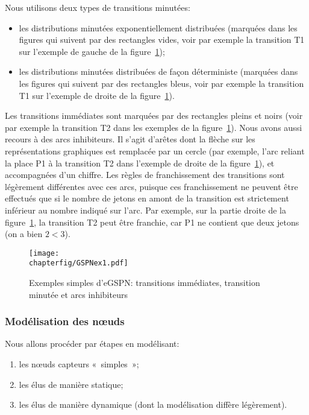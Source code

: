 Nous utilisons deux types de transitions minutées:
\begin{itemize}
    \item les distributions minutées exponentiellement distribuées (marquées dans les figures qui suivent par des rectangles vides, voir par exemple la transition \textsf{T1} sur l'exemple de gauche de la figure~\ref{sa:fig:gspnex1});
    \item les distributions minutées distribuées de façon déterministe (marquées dans les figures qui suivent par des rectangles bleus, voir par exemple la transition \textsf{T1} sur l'exemple de droite de la figure~\ref{sa:fig:gspnex1}).
\end{itemize}
Les transitions immédiates sont marquées par des rectangles pleins et noirs (voir par exemple la transition \textsf{T2} dans les exemples de la figure~\ref{sa:fig:gspnex1}).
Nous avons aussi recours à des arcs inhibiteurs.
Il s'agit d'arêtes dont la flèche sur les représentations graphiques est remplacée par un cercle (par exemple, l'arc reliant la place \textsf{P1} à la transition \textsf{T2} dans l'exemple de droite de la figure~\ref{sa:fig:gspnex1}), et accompagnées d'un chiffre.
Les règles de franchissement des transitions sont légèrement différentes avec ces arcs, puisque ces franchissement ne peuvent être effectués que si le nombre de jetons en amont de la transition est strictement inférieur au nombre indiqué sur l'arc.
Par exemple, sur la partie droite de la figure~\ref{sa:fig:gspnex1}, la transition \textsf{T2} peut être franchie, car \textsf{P1} ne contient que deux jetons (on a bien $2<3$).
\begin{figure}[H]
    \centering
    \texttt{[image: \\chapterfig/GSPNex1.pdf]}
    \caption{Exemples simples d'eGSPN: transitions immédiates, transition minutée et arcs inhibiteurs}\label{sa:fig:gspnex1}
\end{figure}

        \subsubsection{Modélisation des nœuds}
Nous allons procéder par étapes en modélisant:
\begin{enumerate}
    \item les nœuds capteurs «~simples~»;
    \item les \cns élus de manière statique;
    \item les \cns élus de manière dynamique (dont la modélisation diffère légèrement).
\end{enumerate}

